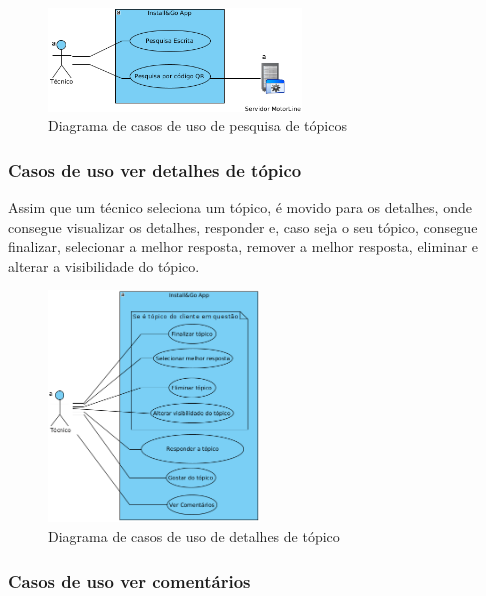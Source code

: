 \begin{figure}[htb]
    \centering
    \includegraphics[width=0.6\textwidth]{images/diagramas/casos_de_uso/use_case_forum_search.png}
    \caption{Diagrama de casos de uso de pesquisa de tópicos}
    \label{fig:13}
\end{figure}

\subsubsection{Casos de uso ver detalhes de tópico}

Assim que um técnico seleciona um tópico, é movido para os 
detalhes, onde consegue visualizar os detalhes, responder e, caso seja o seu tópico, consegue finalizar, selecionar a melhor resposta, remover a melhor resposta, eliminar e alterar a visibilidade do tópico.

\begin{figure}[htb]
    \centering
    
    \includegraphics[width=0.5\textwidth]{images/diagramas/casos_de_uso/use_case_topic_details.png}
    \caption{Diagrama de casos de uso de detalhes de tópico}
    \label{fig:14}
\end{figure}

\subsubsection{Casos de uso ver comentários}

